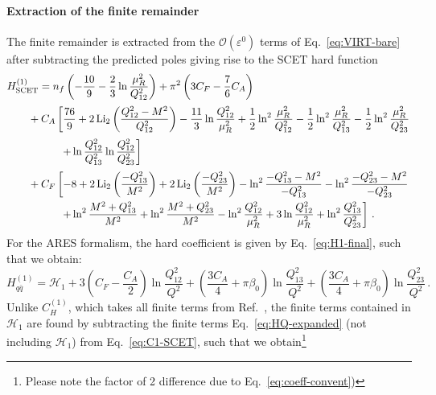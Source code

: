 \paragraph{Extraction of the finite remainder}
The finite remainder is extracted from the
$\mathcal{O}(\varepsilon^0)$ terms of Eq.~\eqref{eq:VIRT-bare}
after subtracting the predicted poles giving rise to
the SCET hard function
\begin{equation}
\label{eq:H1-SCET}
\begin{aligned}
& H^{(1)}_{\rm SCET}=n_f\left(-\frac{10}{9}-\frac{2}{3}\ln\frac{\mu_R^2}{Q_{12}^2}\right)+\pi^2\left(
3C_F-\frac{7}{6}C_A
\right)\\[0.5ex]
& \qquad+C_A\left[
\frac{76}{9}
+2\operatorname{Li}_2\left(\frac{Q_{12}^2-M^2}{Q_{12}^2}\right)
-\frac{11}{3}\ln\frac{Q_{12}^2}{\mu_R^2}
+\frac{1}{2}\ln^2\frac{\mu_R^2}{Q_{12}^2}
-\frac{1}{2}\ln^2\frac{\mu_R^2}{Q_{13}^2}
-\frac{1}{2}\ln^2\frac{\mu_R^2}{Q_{23}^2}\right.\\[0.5ex]
&\quad\qquad\qquad\left.+\ln\frac{Q_{12}^2}{Q_{13}^2}
 \ln\frac{Q_{12}^2}{Q_{23}^2}
\right]\\[0.5ex]
&\qquad+C_F\left[-8
+2\operatorname{Li}_2\left(\frac{-Q_{13}^2}{M^2}\right)
+2\operatorname{Li}_2\left(\frac{-Q_{23}^2}{M^2}\right)
-\ln^2\frac{-Q_{13}^2-M^2}{-Q_{13}^2}
-\ln^2\frac{-Q_{23}^2-M^2}{-Q_{23}^2}\right.\\
&\quad\qquad\qquad\left.
+\ln^2\frac{M^2+Q_{13}^2}{M^2}
+\ln^2\frac{M^2+Q_{23}^2}{M^2}
-\ln^2\frac{Q_{12}^2}{\mu_R^2}
+3\ln\frac{Q_{12}^2}{\mu_R^2}
+\ln^2\frac{Q_{13}^2}{Q_{23}^2}
\right]\,.
\end{aligned}
\end{equation}
For the \textsc{ARES} formalism, the hard coefficient is given by
Eq.~\eqref{eq:H1-final}, such that we obtain: 
\begin{equation}
H_{q\bar{q}}^{(1)}=\mathcal{H}_1
+3\left(C_F-\frac{C_A}{2}\right)\ln\frac{Q_{12}^2}{Q^2}
+\left(\frac{3C_A}{4}+\pi\beta_0\right)\ln\frac{Q_{13}^2}{Q^2}
+\left(\frac{3C_A}{4}+\pi\beta_0\right)\ln\frac{Q_{23}^2}{Q^2}\,.
\end{equation}
Unlike $C^{(1)}_H$, which takes all finite terms from
Ref.~\cite{Ravindran:2002dc}, the finite terms contained in
 $\mathcal{H}_1$ are found by subtracting the finite terms Eq.~\eqref{eq:HQ-expanded} (not including  $\mathcal{H}_1$) from Eq.~\eqref{eq:C1-SCET}, such that we obtain\footnote{Please note the factor of 2 difference due to Eq.~\eqref{eq:coeff-convent}) }
